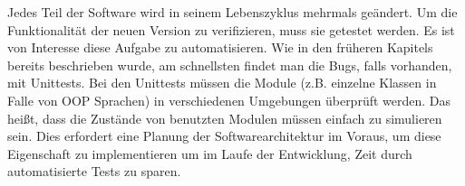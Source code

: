 Jedes Teil der Software wird in seinem Lebenszyklus mehrmals geändert. 
Um die Funktionalität der neuen Version zu verifizieren, muss sie getestet werden.
Es ist von Interesse diese Aufgabe zu automatisieren. 
Wie in den früheren Kapitels bereits beschrieben wurde, am schnellsten findet man die Bugs, falls vorhanden, mit Unittests. 
Bei den Unittests müssen die Module (z.B. einzelne Klassen in Falle von OOP Sprachen) in verschiedenen Umgebungen überprüft werden. 
Das heißt, dass die Zustände von benutzten Modulen müssen einfach zu simulieren sein.
Dies erfordert eine Planung der Softwarearchitektur im Voraus, 
um diese Eigenschaft zu implementieren um im Laufe der Entwicklung, Zeit durch automatisierte Tests zu sparen.
